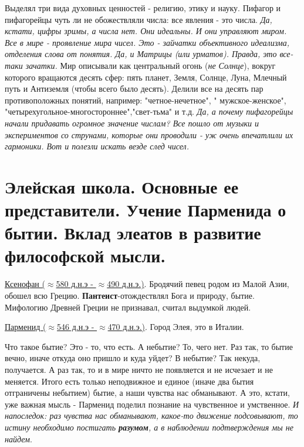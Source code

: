 Выделял три вида духовных ценностей - религию, этику и науку. Пифагор и пифагорейцы чуть ли не обожествляли числа: все явления - это числа. \textit{Да, кстати, цифры зримы, а числа нет. Они идеальны. И они управляют миром. Все в мире - проявление мира чисел. Это - зайчатки объективного идеализма, отделения слова от понятия. Да, и Матрицы (или урматов). Правда, это все-таки зачатки.} Мир описывали как центральный огонь (\textit{не Солнце}), вокруг которого вращаются десять сфер: пять планет, Земля, Солнце, Луна, Млечный путь и Антиземля (чтобы всего было десять). Делили все на десять пар противоположных понятий, например: "четное-нечетное", " мужское-женское", "четырехугольное-многостороннее","свет-тьма" и т.д. \textit{Да, а почему пифагорейцы начали придавать огромное значение числам? Все пошло от музыки и экспериментов со струнами, которые они проводили - уж очень впечатлили их гармоники. Вот и полезли искать везде след чисел.}

\section{Элейская школа. Основные ее представители. Учение Парменида о бытии. Вклад элеатов в развитие философской мысли.}
\underline{Ксенофан ($\approx$580 д.н.э - $\approx$490 д.н.э.)}. Бродячий певец родом из Малой Азии, обошел всю Грецию. \textbf{Пантеист}-отождествлял Бога и природу, бытие. Мифологию Древней Греции не признавал, считал выдумкой людей.

\underline{Парменид ($\approx$546 д.н.э - $\approx$470 д.н.э.)}. Город Элея, это в Италии.


Что такое бытие? Это - то, что есть. А небытие? То, чего нет. Раз так, то бытие вечно, иначе откуда оно пришло и куда уйдет? В небытие? Так некуда, получается. А раз так, то и в мире ничто не появляется и не исчезает и не меняется. Итого есть только неподвижное и единое (иначе два бытия отграничены небытием) бытие, а наши чувства нас обманывают. А это, кстати, уже важная мысль - Парменид поделил познание на чувственное и умственное. \textit{И напоследок: раз чувства нас обманывают, какое-то движение подсовывают, то истину необходимо постигать \textbf{разумом}, а в наблюдении подтверждения мы не найдем}.

